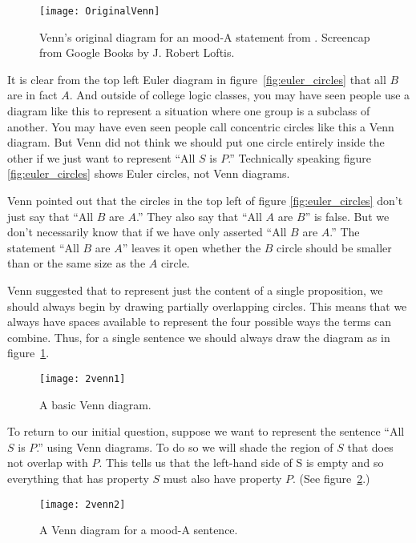\begin{figure}[!ht]
\begin{center}
\texttt{[image: OriginalVenn]}
\end{center}
\caption{Venn's original diagram for an mood-A statement from \parencite{Venn1880a}. Screencap from Google Books by J. Robert Loftis.}
\end{figure}


It is clear from the top left Euler diagram in figure~\ref{fig:euler_circles} that all $B$ are in fact $A$. And outside of college logic classes, you may have seen people use a diagram like this to represent a situation where one group is a subclass of another. You may have even seen people call concentric circles like this a Venn diagram. But Venn did not think we should put one circle entirely inside the other if we just want to represent ``All $S$ is $P$.'' Technically speaking figure \ref{fig:euler_circles} shows Euler circles, not Venn diagrams.

Venn pointed out that the circles in the top left of figure \ref{fig:euler_circles} don't just say that ``All $B$ are $A$.'' They also say that ``All $A$ are $B$'' is false. But we don't necessarily know that if we have only asserted ``All $B$ are $A$.'' The statement ``All $B$ are $A$'' leaves it open whether the $B$ circle should be smaller than or the same size as the $A$ circle.

Venn suggested that to represent just the content of a single proposition, we should always begin by drawing partially overlapping circles. This means that we always have spaces available to represent the four possible ways the terms can combine. Thus, for a single sentence we should always draw the diagram as in figure~\ref{fig:basicvenn}.

\begin{figure}[!ht]\centering
\texttt{[image: 2venn1]}
\caption{A basic Venn diagram.}
\label{fig:basicvenn}
\end{figure}

To return to our initial question, suppose we want to represent the sentence ``All $S$ is $P$.'' using Venn diagrams. To do so we will shade the region of $S$ that does not overlap with $P$. This tells us that the left-hand side of S is empty and so everything that has property $S$ must also have property $P$. (See figure~\ref{fig:mooda}.)

\begin{figure}[!ht]\centering
\texttt{[image: 2venn2]}
\caption{A Venn diagram for a mood-A sentence.}
\label{fig:mooda}
\end{figure}

